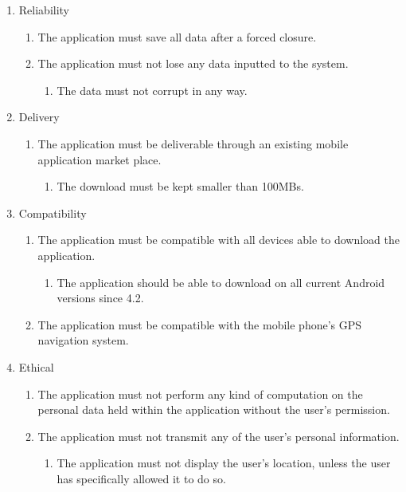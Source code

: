 \documentclass[10pt,a4paper,oneside]{report}
\begin{document}
{\begin{enumerate}
    \item{Reliability}
      \begin{enumerate}[label*=\arabic*.]
      \item{The application must save all data after a forced closure.}
      \item{The application must not lose any data inputted to the system.}
        \begin{enumerate}[label*=\arabic*.]
        \item{The data must not corrupt in any way.}
        \end{enumerate}
      \end{enumerate}


    \item{Delivery}
      \begin{enumerate}[label*=\arabic*.]
      \item{The application must be deliverable through an existing mobile application market place.}
        \begin{enumerate}[label*=\arabic*.]
        \item{The download must be kept smaller than 100MBs.}
        \end{enumerate}
      \end{enumerate}

    \item{Compatibility}
      \begin{enumerate}[label*=\arabic*.]
      \item{The application must be compatible with all devices able to download the application.}
        \begin{enumerate}[label*=\arabic*.]
        \item{The application should be able to download on all current Android versions since 4.2.}
        \end{enumerate}
      \item{The application must be compatible with the mobile phone’s GPS navigation system.}
      \end{enumerate}

    \item{Ethical}
      \begin{enumerate}[label*=\arabic*.]
      \item{The application must not perform any kind of computation on the personal data held within the application without the user’s permission.}
      \item{The application must not transmit any of the user’s personal information.}
        \begin{enumerate}[label*=\arabic*.]
        \item{The application must not display the user’s location, unless the user has specifically allowed it to do so.}
        \end{enumerate}
      \end{enumerate}
\end{enumerate}
}
\end{document}
